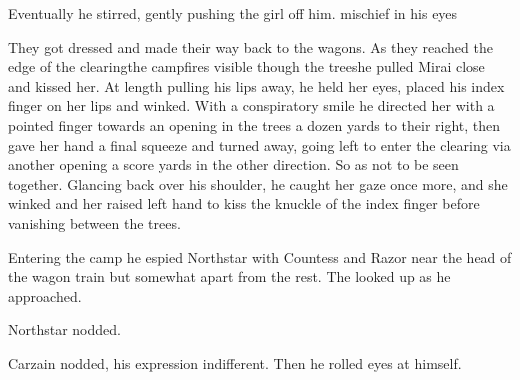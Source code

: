 
Eventually he stirred, gently pushing the girl off him. 
 mischief in his eyes 

They got dressed and made their way back to the wagons. As they reached the edge of the clearing\dash the campfires visible though the trees\dash he pulled Mirai close and kissed her. At length pulling his lips away, he held her eyes, placed his index finger on her lips and winked. With a conspiratory smile he directed her with a pointed finger towards an opening in the trees a dozen yards to their right, then gave her hand a final squeeze and turned away, going left to enter the clearing via another opening a score yards in the other direction. So as not to be seen together. Glancing back over his shoulder, he caught her gaze once more, and she winked and her raised left hand to kiss the knuckle of the index finger before vanishing between the trees. 

Entering the camp he espied Northstar with Countess and Razor near the head of the wagon train but somewhat apart from the rest. The \IlcSR{} looked up as he approached. 


Northstar nodded. 

 Carzain nodded, his expression indifferent. Then he rolled eyes at himself. 



